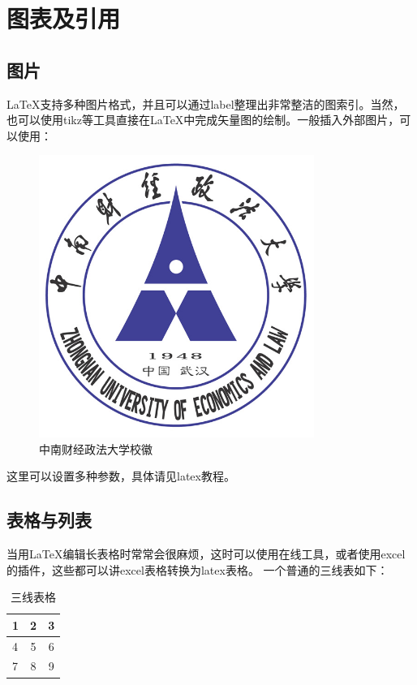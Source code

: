 \chapter{图表及引用}

\section{图片}

\LaTeX 支持多种图片格式，并且可以通过label整理出非常整洁的图索引。当然，也可以使用tikz等工具直接在\LaTeX 中完成矢量图的绘制。一般插入外部图片，可以使用：

\begin{figure}[H]
\centering
\includegraphics [width=0.8\textwidth]{figure//logo.jpg}
\caption{中南财经政法大学校徽}\label{fig1}
\end{figure}

这里可以设置多种参数，具体请见latex教程。

\section{表格与列表}

当用\LaTeX 编辑长表格时常常会很麻烦，这时可以使用在线工具，或者使用excel的插件，这些都可以讲excel表格转换为latex表格。
一个普通的三线表如下：

\begin{table}[H]
	\centering
	\caption{三线表格}
	\label{tab1}
	\begin{tabular}{lcc}
\hline
1 & 2 & 3\\
\hline
4 & 5 & 6\\
7 & 8 & 9\\
\hline
	\end{tabular}
\end{table}

